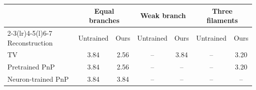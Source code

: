 \begin{tabular}{@{}lcccccc@{}}
\toprule
 & \multicolumn{2}{c}{Equal branches} & \multicolumn{2}{c}{Weak branch} & \multicolumn{2}{c}{Three filaments}\\
\cmidrule(lr){2-3}\cmidrule(lr){4-5}\cmidrule(l){6-7}
Reconstruction & Untrained & Ours & Untrained & Ours & Untrained & Ours\\
\midrule
TV & 3.84 & 2.56 & -- & 3.84 & -- & 3.20\\
Pretrained PnP & 3.84 & 2.56 & -- & -- & -- & 3.20\\
Neuron-trained PnP & 3.84 & 3.84 & -- & -- & -- & --\\
\bottomrule
\end{tabular}
